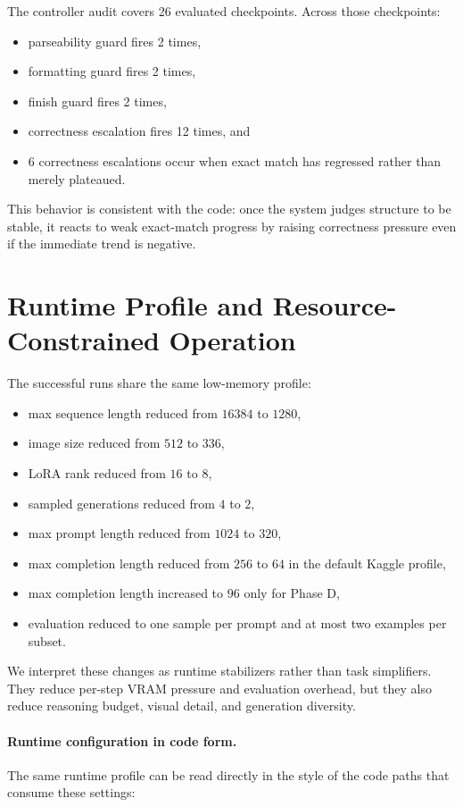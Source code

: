 \documentclass{article} %
\begin{document}
The controller audit covers 26 evaluated checkpoints. Across those checkpoints:
\begin{itemize}[leftmargin=1.2em]
\item parseability guard fires 2 times,
\item formatting guard fires 2 times,
\item finish guard fires 2 times,
\item correctness escalation fires 12 times, and
\item 6 correctness escalations occur when exact match has regressed rather than merely plateaued.
\end{itemize}
This behavior is consistent with the code: once the system judges structure to be stable, it reacts to weak exact-match progress by raising correctness pressure even if the immediate trend is negative.

\section{Runtime Profile and Resource-Constrained Operation}

The successful runs share the same low-memory profile:
\begin{itemize}[leftmargin=1.2em]
\item max sequence length reduced from $16384$ to $1280$,
\item image size reduced from $512$ to $336$,
\item LoRA rank reduced from $16$ to $8$,
\item sampled generations reduced from $4$ to $2$,
\item max prompt length reduced from $1024$ to $320$,
\item max completion length reduced from $256$ to $64$ in the default Kaggle profile,
\item max completion length increased to $96$ only for Phase D,
\item evaluation reduced to one sample per prompt and at most two examples per subset.
\end{itemize}
We interpret these changes as runtime stabilizers rather than task simplifiers. They reduce per-step VRAM pressure and evaluation overhead, but they also reduce reasoning budget, visual detail, and generation diversity.

\paragraph{Runtime configuration in code form.}
The same runtime profile can be read directly in the style of the code paths that consume these settings:
\end{document}
